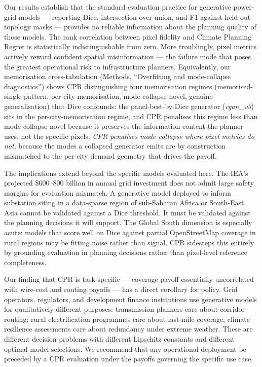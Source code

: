 \documentclass[10pt,a4paper]{article}
\begin{document}
Our results establish that the standard evaluation practice for
generative power-grid models --- reporting Dice,
intersection-over-union, and F1 against held-out topology masks
--- provides no reliable information about the planning quality of
those models. The rank correlation between pixel fidelity and
Climate Planning Regret is statistically indistinguishable from
zero. More troublingly, pixel metrics actively reward confident
spatial misinformation --- the failure mode that poses the
greatest operational risk to infrastructure planners.
Equivalently, our memorisation cross-tabulation
(Methods, ``Overfitting and mode-collapse diagnostics'')
shows CPR distinguishing four memorisation regimes
(memorised-single-pattern, per-city-memorisation,
mode-collapse-novel, genuine-generalisation) that Dice
confounds: the panel-best-by-Dice generator (\textit{cgan\_v3})
sits in the per-city-memorisation regime, and CPR penalises this
regime less than mode-collapse-novel because it preserves the
information-content the planner uses, not the specific pixels.
\emph{CPR penalises mode collapse where pixel metrics do not},
because the modes a collapsed generator emits are by construction
mismatched to the per-city demand geometry that drives the
payoff.

The implications extend beyond the specific models evaluated here.
The IEA's projected \$600--800 billion in annual grid investment
does not admit large safety margins for evaluation mismatch. A
generative model deployed to inform substation siting in a
data-sparse region of sub-Saharan Africa or South-East Asia cannot
be validated against a Dice threshold. It must be validated
against the planning decisions it will support. The Global South
dimension is especially acute: models that score well on Dice
against partial OpenStreetMap coverage in rural regions may be
fitting noise rather than signal. CPR sidesteps this entirely by
grounding evaluation in planning decisions rather than pixel-level
reference completeness.

Our finding that CPR is task-specific --- coverage payoff
essentially uncorrelated with wire-cost and routing payoffs ---
has a direct corollary for policy. Grid operators, regulators, and
development finance institutions use generative models for
qualitatively different purposes: transmission planners care about
corridor routing; rural electrification programmes care about
last-mile coverage; climate resilience assessments care about
redundancy under extreme weather. These are different decision
problems with different Lipschitz constants and different optimal
model selections. We recommend that any operational deployment be
preceded by a CPR evaluation under the payoffs governing the
specific use case.
\end{document}
